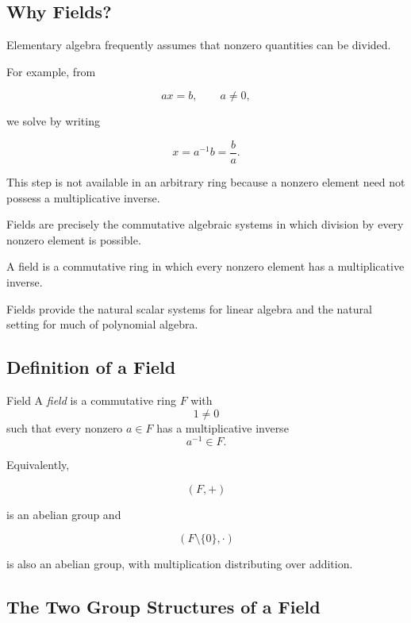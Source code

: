 \subsection{Why Fields?}
\label{subsec:why-fields}

Elementary algebra frequently assumes that nonzero quantities can be divided.

For example, from

\[ ax=b,\qquad a\neq0, \]

we solve by writing

\[ x=a^{-1}b=\frac{b}{a}. \]

This step is not available in an arbitrary ring because a nonzero element
need not possess a multiplicative inverse.

Fields are precisely the commutative algebraic systems in which division by
every nonzero element is possible.

\begin{conceptbox}
A field is a commutative ring in which every nonzero element has a
multiplicative inverse.

Fields provide the natural scalar systems for linear algebra and the natural
setting for much of polynomial algebra.
\end{conceptbox}

\subsection{Definition of a Field}
\label{subsec:definition-field}

\begin{definitionbox}{Field}
A \emph{field} is a commutative ring \(F\) with
\[ 1\neq0 \]
such that every nonzero \(a\in F\) has a multiplicative inverse
\[ a^{-1}\in F. \]
\end{definitionbox}

Equivalently,

\[ (F,+) \]

is an abelian group and

\[ (F\setminus\{0\},\cdot) \]

is also an abelian group, with multiplication distributing over addition.

\subsection{The Two Group Structures of a Field}
\label{subsec:field-two-groups}

